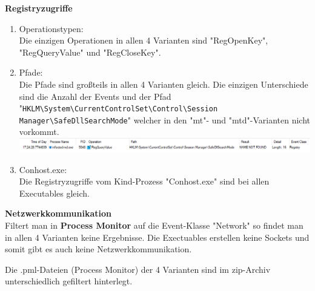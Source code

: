 \documentclass{article}
\begin{document}
	\noindent\textbf{Registryzugriffe}\\
	\begin{enumerate}
		\item Operationstypen:\\
		Die einzigen Operationen in allen 4 Varianten sind "RegOpenKey", "RegQueryValue" und "RegCloseKey".
		\item Pfade:\\
		Die Pfade sind großteils in allen 4 Varianten gleich. Die einzigen Unterschiede sind die Anzahl der Events und der Pfad "\texttt{HKLM\textbackslash System\textbackslash CurrentControlSet\textbackslash Control\textbackslash Session Manager\textbackslash SafeDllSearchMode}" welcher in den "mt"- und "mtd"-Varianten nicht vorkommt.\\
		\includegraphics[width=0.9\linewidth]{"pictures/1.7 event class registry2"}
		\item Conhost.exe:\\
		Die Registryzugriffe vom Kind-Prozess "Conhost.exe" sind bei allen Executables gleich.
	\end{enumerate}
	\noindent\textbf{Netzwerkkommunikation}\\
	Filtert man in \textbf{Process Monitor} auf die Event-Klasse "Network" so findet man in allen 4 Varianten keine Ergebnisse. Die Exectuables erstellen keine Sockets und somit gibt es auch keine Netzwerkkommunikation.
	
	\begin{mynote}
		Die .pml-Dateien (Process Monitor) der 4 Varianten sind im zip-Archiv unterschiedlich gefiltert hinterlegt.
	\end{mynote}
	\pagebreak
	
\end{document}
